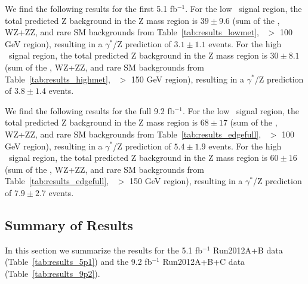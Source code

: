 We find the following results for the first 5.1 fb$^{-1}$. For the low \MET\ signal region, the total predicted Z background in the Z mass region is $39\pm9.6$ 
(sum of the \zjets, WZ+ZZ, and rare SM backgrounds from Table~\ref{tab:results_lowmet}, \MET\ $>$ 100 GeV region), 
resulting in a $\gamma^*$/Z prediction of $3.1\pm1.1$ events. 
For the high \MET\ signal region, the total predicted Z background in the Z mass region is $30\pm8.1$ 
(sum of the \zjets, WZ+ZZ, and rare SM backgrounds from Table~\ref{tab:results_highmet}, \MET\ $>$ 150 GeV region), 
resulting in a $\gamma^*$/Z prediction of $3.8\pm1.4$ events. 

We find the following results for the full 9.2 fb$^{-1}$. For the low \MET\ signal region, the total predicted Z background in the Z mass region is $68\pm17$ 
(sum of the \zjets, WZ+ZZ, and rare SM backgrounds from Table~\ref{tab:results_edgefull}, \MET\ $>$ 100 GeV region), 
resulting in a $\gamma^*$/Z prediction of $5.4\pm1.9$ events. 
For the high \MET\ signal region, the total predicted Z background in the Z mass region is $60\pm16$ 
(sum of the \zjets, WZ+ZZ, and rare SM backgrounds from Table~\ref{tab:results_edgefull}, \MET\ $>$ 150 GeV region), 
resulting in a $\gamma^*$/Z prediction of $7.9\pm2.7$ events. 

\clearpage

\subsection{Summary of Results}
\label{sec:templates_summary}

In this section we summarize the results for the 5.1 fb$^{-1}$ Run2012A+B data (Table~\ref{tab:results_5p1})
and the 9.2 fb$^{-1}$ Run2012A+B+C data (Table~\ref{tab:results_9p2}).

